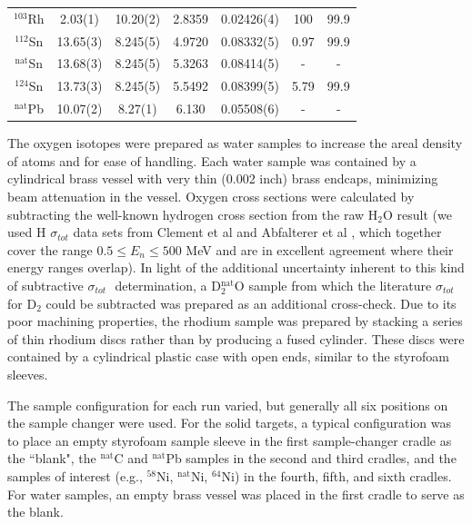 \documentclass[twocolumn,secnumarabic,amssymb, nobibnotes, aps, prl,
superscriptaddress, nobalancelastpage]{revtex4}
\newcommand{\tots}{\ensuremath{\sigma_{tot}}\,\,}
\begin{document}
\begin{table}[ht]
\begin{center}
\begin{tabular}{ c c c c c c c }
            $^{103}$Rh & 2.03(1) & 10.20(2) & 2.8359 & 0.02426(4) & 100 & 99.9\\

            $^{112}$Sn & 13.65(3) & 8.245(5) &
            4.9720 & 0.08332(5) & 0.97 & 99.9\\
            $^{\text{nat}}$Sn & 13.68(3) & 8.245(5) &
            5.3263 & 0.08414(5) & - & -\\
            $^{124}$Sn & 13.73(3) & 8.245(5) &
            5.5492 & 0.08399(5) & 5.79 & 99.9\\

            $^{\text{nat}}$Pb & 10.07(2) & 8.27(1) & 6.130 &
            0.05508(6) & - & -\\

            \hline
        \end{tabular}
    \end{center}
\end{table}

The oxygen isotopes were prepared as water samples to increase the areal density
of atoms and for ease of handling. Each water sample was contained by a
cylindrical brass vessel with very thin (0.002 inch) brass endcaps, minimizing
beam attenuation in the vessel. Oxygen cross sections were calculated by
subtracting the well-known hydrogen cross section from the raw H$_{2}$O result
(we used H \tots data sets from Clement et al \cite{Clement1972} and Abfalterer
et al \cite{Abfalterer2001}, which together cover the range $0.5 \leq E_n \leq 500$ MeV
and are in excellent agreement where their energy ranges overlap). In light of
the additional uncertainty inherent to this kind of subtractive \tots
determination, a D$_{2}^{\text{nat}}$O sample from which the literature \tots for
D$_{2}$ could be subtracted was prepared as an additional cross-check. Due to its poor 
machining properties, the rhodium
sample was prepared by stacking a series of thin rhodium discs rather than by
producing a fused cylinder. These discs were contained by a cylindrical plastic
case with open ends, similar to the styrofoam sleeves.

The sample configuration for each run varied, but generally all six positions on
the sample changer were used. For the solid targets, a typical configuration was
to place an empty styrofoam sample sleeve in the first sample-changer cradle as
the ``blank", the $^{\text{nat}}$C and $^{\text{nat}}$Pb samples in the second and third
cradles, and the samples of interest (e.g., $^{58}$Ni, $^{\text{nat}}$Ni, $^{64}$Ni) in
the fourth, fifth, and sixth cradles. For water samples, an empty brass vessel
was placed in the first cradle to serve as the blank.
\end{document}
